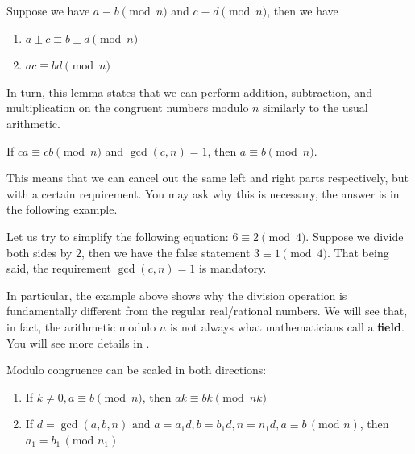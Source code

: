 \documentclass[../lecture-notes.tex]{subfiles}
\begin{document}
\begin{lemma}
    Suppose we have $a \equiv b \pmod{n}$ and $c \equiv d \pmod{n}$, then we have 
        \begin{enumerate}
            \item $a \pm c \equiv b \pm d \pmod{n}$
            \item $ac \equiv bd \pmod{n}$
        \end{enumerate}
\end{lemma}

In turn, this lemma states that we can perform addition, subtraction, and multiplication on the congruent numbers modulo $n$ similarly to the usual arithmetic.

\begin{lemma}
    If $ca \equiv cb \pmod{n}$ and $\gcd(c, n) = 1$, then $ a \equiv b \pmod{n}$.
\end{lemma}

This means that we can cancel out the same left and right parts respectively, but with a certain requirement. You may ask why this is necessary, the answer is in the following example.

\begin{example}
    Let us try to simplify the following equation: $6 \equiv 2 \pmod{4}$. Suppose we divide both sides by $2$, then we have the false statement $3 \equiv 1 \pmod{4}$. That being said, the requirement $\gcd(c, n) = 1$ is mandatory. 
\end{example}

\begin{remark}
    In particular, the example above shows why the division operation is fundamentally different from the regular real/rational numbers. We will see that, in fact, the arithmetic modulo $n$ is not always what mathematicians call a \textbf{field}. You will see more details in .
\end{remark}

\begin{lemma}
    Modulo congruence can be scaled in both directions:
    
    \begin{enumerate}
        \item If $k \neq 0, a \equiv b \pmod{n}$, then $ak \equiv bk \pmod{nk}$
        \item If $d = \gcd(a, b, n) \text{ and } a = a_1d, b =b_1d, n = n_1d, a \equiv b \, (\text{mod } n)$, then $a_1 = b_1 \, (\text{mod } n_1)$
    \end{enumerate}
\end{lemma}
\end{document}
